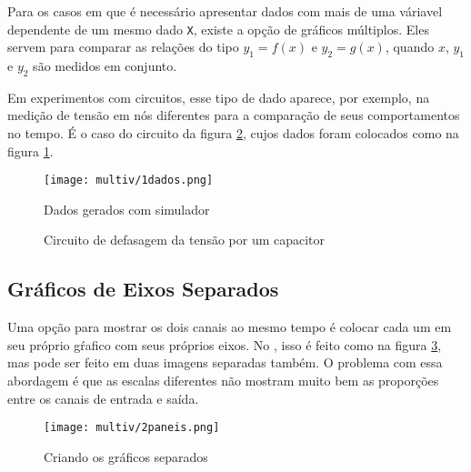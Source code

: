 \edef\indentacao{\the\parindent}

\noindent
\begin{minipage}[t]{0.55\textwidth}\setlength{\parindent}{\indentacao}

    Para os casos em que é necessário apresentar dados com mais de uma váriavel dependente de um mesmo dado \texttt{X}, existe a opção de gráficos múltiplos. Eles servem para comparar as relações do tipo $y_1 = f(x)$ e $y_2 = g(x)$, quando $x$, $y_1$ e $y_2$ são medidos em conjunto.

    Em experimentos com circuitos, esse tipo de dado aparece, por exemplo, na medição de tensão em nós diferentes para a comparação de seus comportamentos no tempo. É o caso do circuito da figura \ref{fig:multiv:circuito}, cujos dados foram colocados como na figura \ref{fig:multiv:dados}.

    \begin{figure}[H]
        \centering
        \texttt{[image: multiv/1dados.png]}

        \caption{Dados gerados com simulador}
        \label{fig:multiv:dados}
    \end{figure}

\end{minipage}\vspace{0.05\textwidth}%
\begin{minipage}[t]{0.4\textwidth}
    \begin{figure}[H]
        \centering
        

        \caption{Circuito de defasagem da tensão por um capacitor}
        \label{fig:multiv:circuito}
    \end{figure}
\end{minipage}


\subsection{Gráficos de Eixos Separados}

    Uma opção para mostrar os dois canais ao mesmo tempo é colocar cada um em seu próprio gŕafico com seus próprios eixos. No \software, isso é feito como na figura \ref{fig:multiv:paneis:tutorial}, mas pode ser feito em duas imagens separadas também. O problema com essa abordagem é que as escalas diferentes não mostram muito bem as proporções entre os canais de entrada e saída.

    \begin{figure}[H]
        \centering
        \texttt{[image: multiv/2paneis.png]}

        \caption{Criando os gráficos separados}
        \label{fig:multiv:paneis:tutorial}
    \end{figure}

